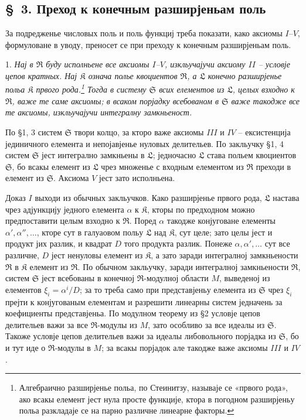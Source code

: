 ﻿\documentclass[11pt]{article}
\providecommand{\mR}{\mathfrak{R}}
\providecommand{\mK}{\mathfrak{K}}
\providecommand{\mL}{\mathfrak{L}}
\providecommand{\mS}{\mathfrak{S}}
\begin{document}
\setcounter{footnote}{12}

\subsection*{\S~3. Преход к конечным разширјеньам поль}

За подредженье числовых поль и поль функциј треба показати, како аксиомы $I$--$V$, формуловане в уводу, преносет се при преходу к конечным разширјеньам поль.

1. {\itshape Нај в $\mR$ буду исполньене все аксиомы $I$--$V$, изкльучајучи аксиому $II$ -- условје цепов кратных. Нај $\mK$ означа полье квоциентов $\mR$, а $\mL$ конечно разширјенье польа $\mK$ првого рода.\footnote{Алгебраично разширјенье польа, по Стеинитзу, называје се «првого рода», ако всакы елемент јест нула просте функције, ктора в погодном разширјеньу польа разкладаје се на парно различне линеарне факторы.} Тогда в систему $\mS$ всих елементов из $\mL$, целых взходно к $\mR$, важе те саме аксиомы; в всаком порјадку всебованом в $\mS$ важе такодже все те аксиомы, изкльучајучи интегралну замкньеност.}

По §1, 3 систем $\mS$ твори колцо, за кторо важе аксиомы $III$ и $IV$ -- ексистенција јединичного елемента и непојавјенье нуловых делительев. По закльучку §1, 4 систем $\mS$ јест интегрално замкньены в $\mL$; једночасно $\mL$ става польем квоциентов $\mS$, бо всакы елемент из $\mL$ чрез множенье с входным елементом из $\mR$ преходи в елемент из $\mS$. Аксиома $V$ јест зато исполньена.

Доказ $I$ выходи из обычных закльучков. Како разширјенье првого рода, $\mL$ настава чрез адјункцију једного елемента $\alpha$ к $\mK$, кторы по предходном можно предпоставити целым взходно к $\mR$. Поред $\alpha$ такодже конјуговане елементы $\alpha',\alpha'',\ldots$, кторе сут в галуаовом польу $\mL$ над $\mK$, сут целе; зато целы јест и продукт јих разлик, и квадрат $D$ того продукта разлик. Понеже $\alpha,\alpha',\ldots$ сут все различне, $D$ јест ненуловы елемент из $\mK$, а зато заради интегралној замкньености $\mR$ в $\mK$ елемент из $\mR$. По обычном закльучку, заради интегралној замкньености $\mR$, систем $\mS$ јест всебованы в конечној $\mR$-модулној области $M$, выведеној из елементов $\xi_i=\alpha^i/D$; за то треба само при представјеньу елемента из $\mS$ чрез $\xi_i$ прејти к конјугованым елементам и разрешити линеарны систем једначень за коефициенты представјеньа. По модулном теорему из §2 условје цепов делительев важи за все $\mR$-модулы из $M$, зато особливо за все идеалы из $\mS$. Такоже условје цепов делительев важи за идеалы либовольного порјадка из $\mS$, бо и тут иде о $\mR$-модулы в $M$; за всакы порјадок але такодже важе аксиомы $III$ и $IV$.
\end{document}
